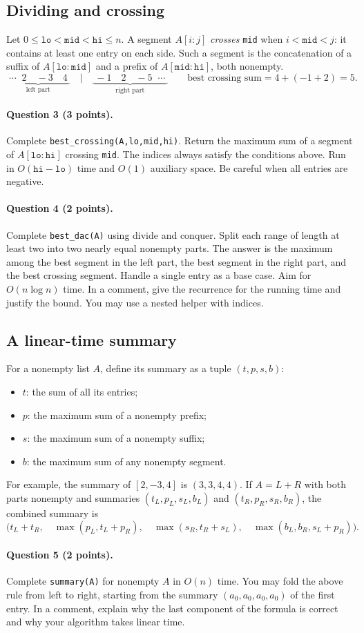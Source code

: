 \documentclass[11pt,a4paper]{article}
\newcommand{\q}[2]{\paragraph{Question #1 (#2 points).}}
\begin{document}
\subsection*{Dividing and crossing}
Let $0\le \texttt{lo}<\texttt{mid}<\texttt{hi}\le n$. A segment $A[i:j]$ \emph{crosses} \texttt{mid} when $i<\texttt{mid}<j$: it contains at least one entry on each side. Such a segment is the concatenation of a suffix of $A[\texttt{lo}:\texttt{mid}]$ and a prefix of $A[\texttt{mid}:\texttt{hi}]$, both nonempty.
\[
\underbrace{\boxed{\;\cdots\;\;2\quad -3\quad 4\;}}_{\text{left part}}
\quad\Big|\quad
\underbrace{\boxed{\;-1\quad 2\quad -5\;\;\cdots\;}}_{\text{right part}}
\qquad \text{best crossing sum} = 4+(-1+2)=5.
\]
\q{3}{3} Complete \texttt{best\_crossing(A,lo,mid,hi)}. Return the maximum sum of a segment of $A[\texttt{lo}:\texttt{hi}]$ crossing \texttt{mid}. The indices always satisfy the conditions above. Run in $O(\texttt{hi}-\texttt{lo})$ time and $O(1)$ auxiliary space. Be careful when all entries are negative.
\q{4}{2} Complete \texttt{best\_dac(A)} using divide and conquer. Split each range of length at least two into two nearly equal nonempty parts. The answer is the maximum among the best segment in the left part, the best segment in the right part, and the best crossing segment. Handle a single entry as a base case. Aim for $O(n\log n)$ time. In a comment, give the recurrence for the running time and justify the bound. You may use a nested helper with indices.
\newpage
\subsection*{A linear-time summary}
For a nonempty list $A$, define its summary as a tuple $(t,p,s,b)$:
\begin{itemize}[nosep]
\item $t$: the sum of all its entries;
\item $p$: the maximum sum of a nonempty prefix;
\item $s$: the maximum sum of a nonempty suffix;
\item $b$: the maximum sum of any nonempty segment.
\end{itemize}
For example, the summary of $[2,-3,4]$ is $(3,3,4,4)$. If $A=L+R$ with both parts nonempty and summaries $(t_L,p_L,s_L,b_L)$ and $(t_R,p_R,s_R,b_R)$, the combined summary is
\[
\bigl(t_L+t_R,\quad \max(p_L,t_L+p_R),\quad
\max(s_R,t_R+s_L),\quad \max(b_L,b_R,s_L+p_R)\bigr).
\]
\q{5}{2} Complete \texttt{summary(A)} for nonempty $A$ in $O(n)$ time. You may fold the above rule from left to right, starting from the summary $(a_0,a_0,a_0,a_0)$ of the first entry. In a comment, explain why the last component of the formula is correct and why your algorithm takes linear time.
\newpage
\end{document}
